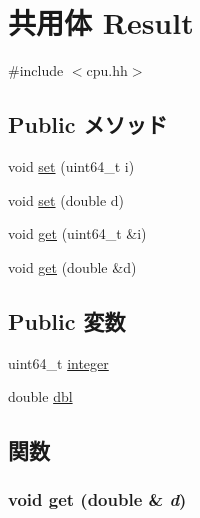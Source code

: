 \hypertarget{unionCheckerCPU_1_1Result}{
\section{共用体 Result}
\label{unionCheckerCPU_1_1Result}
}


{\ttfamily \#include $<$cpu.hh$>$}\subsection*{Public メソッド}
\begin{DoxyCompactItemize}
\item 
void \hyperlink{unionCheckerCPU_1_1Result_a30a5b4d2249237f50ab1a3d705ed91ed}{set} (uint64\_\-t i)
\item 
void \hyperlink{unionCheckerCPU_1_1Result_ae0ede19c410ba9c2044cd103cdc8c6c5}{set} (double d)
\item 
void \hyperlink{unionCheckerCPU_1_1Result_a48451357be4a53c83f1bdd243df37d2a}{get} (uint64\_\-t \&i)
\item 
void \hyperlink{unionCheckerCPU_1_1Result_a47bb6359bb9f1642a6bf2b64725658ae}{get} (double \&d)
\end{DoxyCompactItemize}
\subsection*{Public 変数}
\begin{DoxyCompactItemize}
\item 
uint64\_\-t \hyperlink{unionCheckerCPU_1_1Result_a88f9f5e1216d6aaa43434facecd25bc4}{integer}
\item 
double \hyperlink{unionCheckerCPU_1_1Result_a57291299e530453fdec37a931c728239}{dbl}
\end{DoxyCompactItemize}


\subsection{関数}
\hypertarget{unionCheckerCPU_1_1Result_a47bb6359bb9f1642a6bf2b64725658ae}{
\subsubsection[{get}]{\setlength{\rightskip}{0pt plus 5cm}void get (double \& {\em d})}}
\label{unionCheckerCPU_1_1Result_a47bb6359bb9f1642a6bf2b64725658ae}



